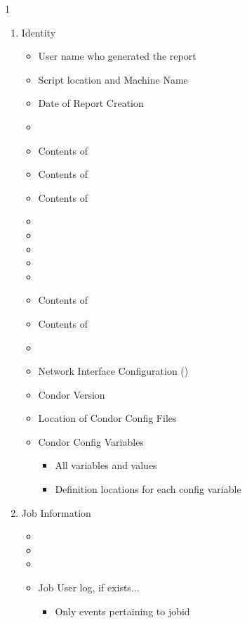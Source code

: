 \begin{ManPage}{\label{man-condor-gather-info}}{1}
\begin{enumerate}
	\item Identity
	\begin{itemize}
          \item User name who generated the report
          \item Script location and Machine Name
          \item Date of Report Creation
          \item {}
          \item Contents of 
          \item Contents of 
          \item Contents of 
          \item {}
          \item {}
          \item {}
          \item {}
          \item {}
          \item Contents of 
          \item Contents of 
          \item {}
          \item Network Interface Configuration ()
          \item Condor Version
          \item Location of Condor Config Files
          \item Condor Config Variables
		  \begin{itemize}
                \item All variables and values
                \item Definition locations for each config variable 
		  \end{itemize}
	\end{itemize}
	\item Job Information
	\begin{itemize}
    	\item {}
    	\item {}
    	\item {}
    	\item Job User log, if exists...
		\begin{itemize}
          	\item Only events pertaining to jobid 
		\end{itemize}
	\end{itemize}
\end{enumerate}


\end{ManPage}
